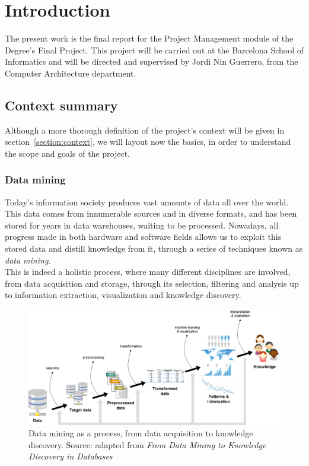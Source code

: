 \section{Introduction}
\label{section:introduction}

The present work is the final report for the Project Management module of the Degree's Final Project. This project will be carried out at the Barcelona School of Informatics and will be directed and supervised by Jordi Nin Guerrero, from the Computer Architecture department.

\subsection{Context summary}

Although a more thorough definition of the project's context will be given in section~\ref{section:context}, we will layout now the basics, in order to understand the scope and goals of the project.

\subsubsection{Data mining}
Today’s information society produces vast amounts of data all over the world. This data comes from innumerable sources and in diverse formats, and has been stored for years in data warehouses, waiting to be processed. Nowadays, all progress made in both hardware and software fields allows us to exploit this stored data and distill knowledge from it, through a series of techniques known as \textit{data mining}.\\

This is indeed a holistic process, where many different disciplines are involved, from data acquisition and storage, through its selection, filtering and analysis up to information extraction, visualization and knowledge discovery.\\

\begin{figure}[h]
	\centering
	\includegraphics[width=0.9\linewidth]{figures/Untitled.png}
	\caption{Data mining as a process, from data acquisition to knowledge discovery. Source: adapted from \textit{From Data Mining to Knowledge Discovery in Databases}~\cite{Fayyad:1996:DMK:257938.257942}}
	\label{fig:data-mining}
\end{figure}


